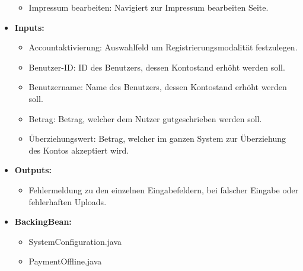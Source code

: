 \begin{itemize}
\begin{itemize}
								\item Impressum bearbeiten: Navigiert zur Impressum bearbeiten Seite.
							\end{itemize}
						\item \textbf{Inputs:}
							\begin{itemize}
								\item Accountaktivierung: Auswahlfeld um Registrierungsmodalität festzulegen.
								\item Benutzer-ID: ID des Benutzers, dessen Kontostand erhöht werden soll.
								\item Benutzername: Name des Benutzers, dessen Kontostand erhöht werden soll.
								\item Betrag: Betrag, welcher dem Nutzer gutgeschrieben werden soll.
								\item Überziehungswert: Betrag, welcher im ganzen System zur Überziehung des Kontos akzeptiert wird.
							\end{itemize}
						\item \textbf{Outputs:}
							\begin{itemize}
								\item Fehlermeldung zu den einzelnen Eingabefeldern, bei falscher Eingabe oder fehlerhaften Uploads.
							\end{itemize}
						\item \textbf{BackingBean:}
							\begin{itemize}
								\item SystemConfiguration.java
								\item PaymentOffline.java
							\end{itemize}
					\end{itemize}
				
